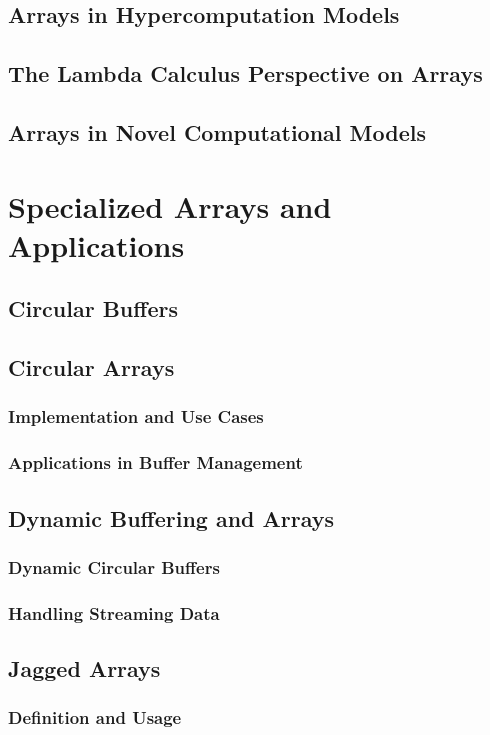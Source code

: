 \documentclass[12pt, oneside]{book}
\begin{document}
\section{Arrays in Hypercomputation Models}
\section{The Lambda Calculus Perspective on Arrays}
\section{Arrays in Novel Computational Models}

\chapter{Specialized Arrays and Applications}
	\section{Circular Buffers}
	\section{Circular Arrays}
	\subsection{Implementation and Use Cases}
	\subsection{Applications in Buffer Management}
	
	\section{Dynamic Buffering and Arrays}
	\subsection{Dynamic Circular Buffers}
	\subsection{Handling Streaming Data}
	
	\section{Jagged Arrays}
	\subsection{Definition and Usage}
\end{document}
